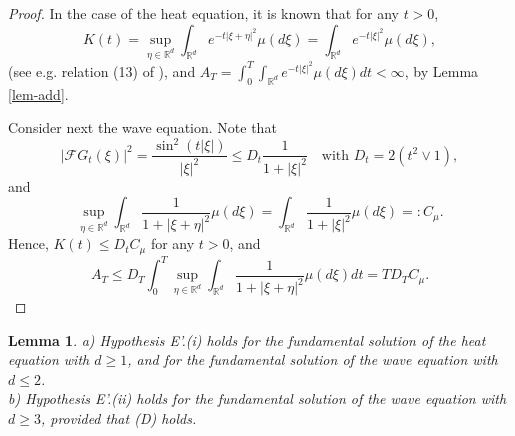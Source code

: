 \documentclass[12pt]{article}
\newtheorem{lemma}[theorem]{Lemma}
\def\cF{\mathcal{F}}
\def\bR{\mathbb{R}}
\begin{document}
\begin{proof}
In the case of the heat equation, it is known that for any $t>0$,
\begin{equation}
\label{max-heat}
K(t)=\sup_{\eta \in \bR^d} \int_{\bR^d} e^{-t|\xi+\eta|^2}\mu(d\xi)= \int_{\bR^d} e^{-t|\xi|^2}\mu(d\xi),
\end{equation}
(see e.g. relation (13) of \cite{BY23}), and  $A_T = \int_0^T \int_{\bR^d} e^{-t|\xi|^2}\mu(d\xi)dt<\infty$, by Lemma \ref{lem-add}. 

Consider next the wave equation.  Note that
\begin{equation}
\label{bound-Gw}
|\cF G_t(\xi)|^2 =\frac{\sin^2(t|\xi|)}{|\xi|^2} \leq D_t \frac{1}{1+|\xi|^2} \quad \mbox{with $D_t=2(t^2 \vee 1)$},
\end{equation}
and
\begin{equation}
\label{max-principle}
\sup_{\eta \in \bR^d}\int_{\bR^d}\frac{1}{1+|\xi+\eta|^2}\mu(d\xi)=\int_{\bR^d}\frac{1}{1+|\xi|^2}\mu(d\xi)=:C_{\mu}.
\end{equation}
Hence, $K(t) \leq D_t C_{\mu}$ for any $t>0$, and
\[
A_T \leq D_T \int_0^T \sup_{\eta \in \bR^d}\int_{\bR^d}\frac{1}{1+|\xi+\eta|^2}\mu(d\xi)dt=T D_T C_{\mu}.
\]
\end{proof}

\begin{lemma}
a) Hypothesis E'.(i) holds for the fundamental solution of the heat equation with $d\geq 1$, and for the fundamental solution of the wave equation with $d\leq 2$.\\
b) Hypothesis E'.(ii) holds for the fundamental solution of the wave equation with $d\geq 3$, provided that (D) holds.
\end{lemma}
\end{document}
